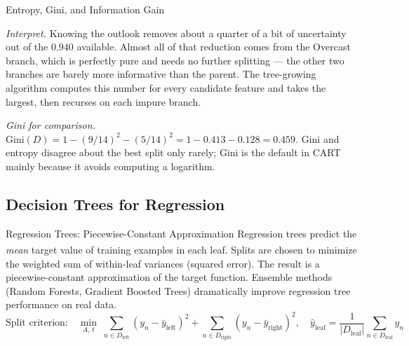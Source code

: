 \begin{v3topic}{Entropy, Gini, and Information Gain}
\begin{workedexample}
\emph{Interpret.} Knowing the outlook removes about a quarter of a bit of
uncertainty out of the $0.940$ available. Almost all of that reduction comes
from the Overcast branch, which is perfectly pure and needs no further
splitting --- the other two branches are barely more informative than the
parent. The tree-growing algorithm computes this number for every candidate
feature and takes the largest, then recurses on each impure branch.

\emph{Gini for comparison.} $\text{Gini}(D) = 1 - (9/14)^2 - (5/14)^2
= 1 - 0.413 - 0.128 = 0.459$. Gini and entropy disagree about the best split
only rarely; Gini is the default in CART mainly because it avoids computing a
logarithm.
\end{workedexample}
\end{v3topic}

\subsection{Decision Trees for Regression}

\begin{v3topic}{Regression Trees: Piecewise-Constant Approximation}
    Regression trees predict the \emph{mean} target value of training examples in each leaf\textsuperscript{\cite[][pp.~8--20]{iiiCourseMachineLearning}}. Splits are chosen to minimize the weighted sum of within-leaf variances (squared error). The result is a piecewise-constant approximation of the target function. Ensemble methods (Random Forests, Gradient Boosted Trees) dramatically improve regression tree performance on real data.
\visualseparator
    \begin{equation}
        \text{Split criterion:} \quad
        \min_{A,\, t}\;\sum_{n \in D_{\text{left}}}\!\!(y_n - \bar{y}_{\text{left}})^2
        +\sum_{n \in D_{\text{right}}}\!\!(y_n - \bar{y}_{\text{right}})^2,
        \quad
        \hat{y}_{\text{leaf}} = \frac{1}{|D_{\text{leaf}}|}\sum_{n \in D_{\text{leaf}}} y_n
    \end{equation}
\end{v3topic}

